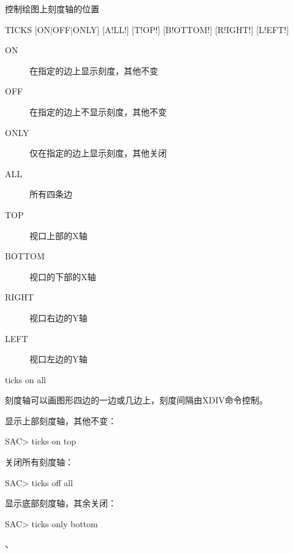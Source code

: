 \label{cmd:ticks}

控制绘图上刻度轴的位置

\begin{SACSTX}
TICKS [ON|OFF|ONLY] [A!LL!] [T!OP!] [B!OTTOM!] [R!IGHT!] [L!EFT!]
\end{SACSTX}

\begin{description}
\item [ON] 在指定的边上显示刻度，其他不变 
\item [OFF] 在指定的边上不显示刻度，其他不变 
\item [ONLY] 仅在指定的边上显示刻度，其他关闭 
\item [ALL] 所有四条边
\item [TOP] 视口上部的X轴
\item [BOTTOM] 视口的下部的X轴 
\item [RIGHT] 视口右边的Y轴 
\item [LEFT] 视口左边的Y轴 
\end{description}

\begin{SACDFT}
ticks on all
\end{SACDFT}

刻度轴可以画图形四边的一边或几边上，刻度间隔由XDIV命令控制。

显示上部刻度轴，其他不变：
\begin{SACCode}
SAC> ticks on top
\end{SACCode}

关闭所有刻度轴：
\begin{SACCode}
SAC> ticks off all
\end{SACCode}

显示底部刻度轴，其余关闭：
\begin{SACCode}
SAC> ticks only bottom
\end{SACCode}

、
